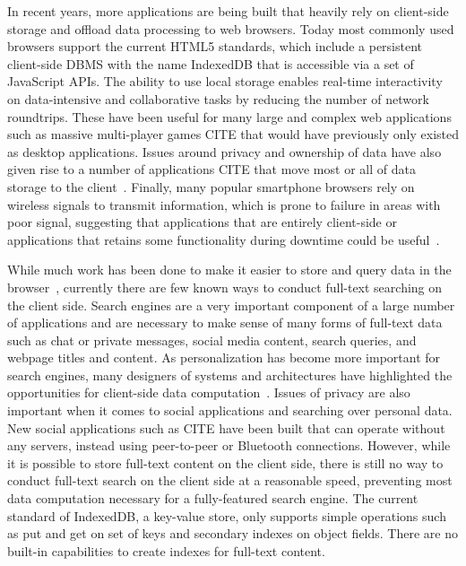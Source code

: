 \documentclass{vldb}
\begin{document}
In recent years, more applications are being built that heavily rely on client-side storage and offload data processing to web browsers. Today most commonly used browsers support the current HTML5 standards, which include a persistent client-side DBMS with the name IndexedDB that is accessible via a set of JavaScript APIs. 
The ability to use local storage enables real-time interactivity on data-intensive and collaborative tasks by reducing the number of network roundtrips.
These have been useful for many large and complex web applications such as massive multi-player games CITE that would have previously only existed as desktop applications.
Issues around privacy and ownership of data have also given rise to a number of applications CITE that move most or all of data storage to the client~\cite{bilenko2011predictive}. 
Finally, many popular smartphone browsers rely on wireless signals to transmit information, which is prone to failure in areas with poor signal, suggesting that applications that are entirely client-side or applications that retains some functionality during downtime could be useful~\cite{balasubramanian2012findall}.

While much work has been done to make it easier to store and query data in the browser~\cite{benson2010sync}, currently there are few known ways to conduct full-text searching on the client side. Search engines are a very important component of a large number of applications and are necessary to make sense of many forms of full-text data such as chat or private messages, social media content, search queries, and webpage titles and content. 
As personalization has become more important for search engines, many designers of systems and architectures have highlighted the opportunities for client-side data computation~\cite{bharat2000searchpad,teevan2005personalizing}.
Issues of privacy are also important when it comes to social applications and searching over personal data. New social applications such as CITE have been built that can operate without any servers, instead using peer-to-peer or Bluetooth connections.
However, while it is possible to store full-text content on the client side, there is still no way to conduct full-text search on the client side at a reasonable speed, preventing most data computation necessary for a fully-featured search engine.
The current standard of IndexedDB, a key-value store, only supports simple operations such as put and get on set of keys and secondary indexes on object fields. There are no built-in capabilities to create indexes for full-text content. 
\end{document}
